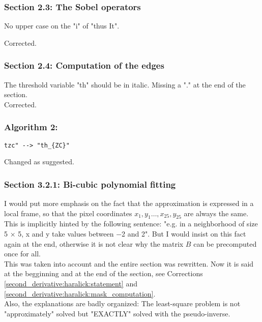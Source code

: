\documentclass[a4paper,10pt]{report}
\begin{document}
\subsubsection{ Section 2.3: The Sobel operators}
\que No upper case on the "i" of "thus It".

\ans Corrected.\\

\subsubsection{Section 2.4: Computation of the edges}
\que The threshold variable "th" should be in italic.
Missing a "." at the end of the section.\\

\ans Corrected.\\

\subsubsection{Algorithm 2:}
\que
\begin{verbatim}
tzc" --> "th_{ZC}"
\end{verbatim}

\ans Changed as suggested.\\

\subsubsection{ Section 3.2.1: Bi-cubic polynomial fitting}

\que I would put more emphasis on the fact that the approximation is expressed in a
local frame, so that the pixel coordinates $x_1,y_1\dots,x_{25},y_{25}$ are
always the same. This is implicitly hinted by the following sentence:
"e.g. in a neighborhood of size 5 × 5, x and y take values between −2 and 2".
But I would insist on this fact again at the end, otherwise it is not clear why
the matrix $B$ can be precomputed once for all.\\

\ans This was taken into account and the entire section was rewritten. Now it is said at the begginning and at the end of the section, see Corrections \ref{second_derivative:haralick:statement} and \ref{second_derivative:haralick:mask_computation}.\\

Also, the explanations are badly organized:
\que  The least-square problem is not "approximately" solved but "EXACTLY" solved with the pseudo-inverse.\\
\end{document}
